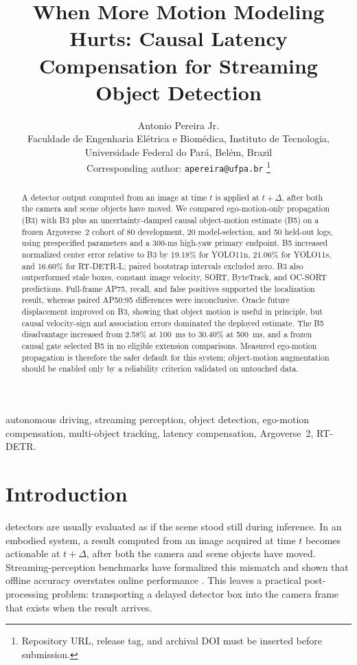 \documentclass[journal]{IEEEtran}
\title{When More Motion Modeling Hurts: Causal Latency Compensation for Streaming Object Detection}
\author{Antonio Pereira Jr.\\
\small Faculdade de Engenharia El\'etrica e Biom\'edica, Instituto de Tecnologia, Universidade Federal do Par\'a, Bel\'em, Brazil\\
\small Corresponding author: \texttt{apereira@ufpa.br}
\thanks{Repository URL, release tag, and archival DOI must be inserted before submission.}}
\begin{document}
\maketitle

\begin{abstract}
A detector output computed from an image at time $t$ is applied at $t+\Delta$, after both the camera and scene objects have moved. We compared ego-motion-only propagation (B3) with B3 plus an uncertainty-damped causal object-motion estimate (B5) on a frozen Argoverse~2 cohort of 80 development, 20 model-selection, and 50 held-out logs, using prespecified parameters and a 300-ms high-yaw primary endpoint. B5 increased normalized center error relative to B3 by 19.18\% for YOLO11n, 21.06\% for YOLO11s, and 16.60\% for RT-DETR-L; paired bootstrap intervals excluded zero. B3 also outperformed stale boxes, constant image velocity, SORT, ByteTrack, and OC-SORT predictions. Full-frame AP75, recall, and false positives supported the localization result, whereas paired AP50:95 differences were inconclusive. Oracle future displacement improved on B3, showing that object motion is useful in principle, but causal velocity-sign and association errors dominated the deployed estimate. The B5 disadvantage increased from 2.58\% at 100~ms to 30.40\% at 500~ms, and a frozen causal gate selected B5 in no eligible extension comparisons. Measured ego-motion propagation is therefore the safer default for this system; object-motion augmentation should be enabled only by a reliability criterion validated on untouched data.
\end{abstract}


\begin{IEEEkeywords}
autonomous driving, streaming perception, object detection, ego-motion compensation, multi-object tracking, latency compensation, Argoverse~2, RT-DETR.
\end{IEEEkeywords}

\section{Introduction}
 detectors are usually evaluated as if the scene stood still during inference. In an embodied system, a result computed from an image acquired at time $t$ becomes actionable at $t+\Delta$, after both the camera and scene objects have moved. Streaming-perception benchmarks have formalized this mismatch and shown that offline accuracy overstates online performance \cite{Li2020Streaming,Yang2022Streaming,Wang2023ASAP}. This leaves a practical post-processing problem: transporting a delayed detector box into the camera frame that exists when the result arrives.
\end{document}
